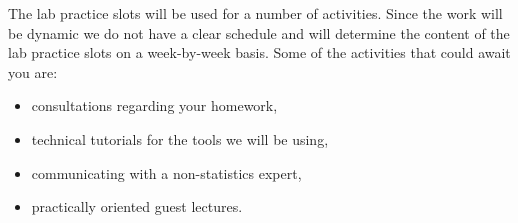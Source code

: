 \documentclass[fleqn,moreauthors,10pt]{ds_report}
\begin{document}
The lab practice slots will be used for a number of activities. Since the work will be dynamic we do not have a clear schedule and will determine the content of the lab practice slots on a week-by-week basis. Some of the activities that could await you are:

\begin{itemize}
	\item consultations regarding your homework,
	\item technical tutorials for the tools we will be using,
	\item communicating with a non-statistics expert,
	\item practically oriented guest lectures.
\end{itemize}
\end{document}
